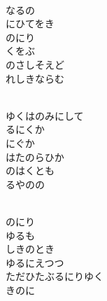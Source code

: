 \documentclass[10pt,b5j]{tarticle} %
\begin{document}
\vspace{1.5em} %
\newcommand{\linespace}{0.5em} %
\newcommand{\blocksize}{0.5\hsize} %
\newcommand{\itemmargin}{6em} %
\begin{enumerate} %
    \setlength{\itemindent}{\itemmargin} %
    \begin{minipage}[c]{\blocksize}
    
        \vspace{\linespace}
        \item~\\
        なるの\\
        にひてをき\\
        のにり\\
        くをぶ\\
        のさしそえど\\
        れしきならむ
        
        \vspace{\linespace}
        \item~\\
        ゆくはのみにして\\
        るにくか\\
        にぐか\\
        はたのらひか\\
        のはくとも\\
        るやのの
        
        \vspace{\linespace}
        \item~\\
        のにり\\
        ゆるも\\
        しきのとき\\
        ゆるにえつつ\\
        ただひたぶるにりゆく\\
        きのに
        

\end{minipage}
\end{enumerate}
\end{document}

